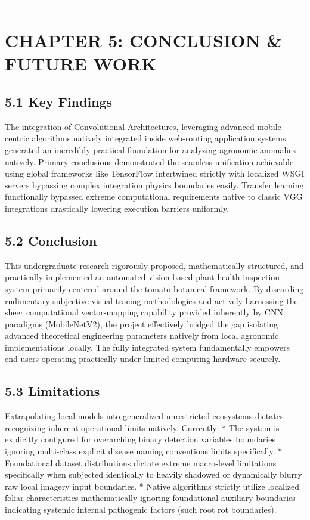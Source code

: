 \documentclass[
]{article}
\begin{document}
\begin{center}\rule{0.5\linewidth}{0.5pt}\end{center}

\section{CHAPTER 5: CONCLUSION \& FUTURE
WORK}\label{chapter-5-conclusion-future-work}

\subsection{5.1 Key Findings}\label{key-findings}

The integration of Convolutional Architectures, leveraging advanced
mobile-centric algorithms natively integrated inside web-routing
application systems generated an incredibly practical foundation for
analyzing agronomic anomalies natively. Primary conclusions demonstrated
the seamless unification achievable using global frameworks like
TensorFlow intertwined strictly with localized WSGI servers bypassing
complex integration physics boundaries easily. Transfer learning
functionally bypassed extreme computational requirements native to
classic VGG integrations drastically lowering execution barriers
uniformly.

\subsection{5.2 Conclusion}\label{conclusion}

This undergraduate research rigorously proposed, mathematically
structured, and practically implemented an automated vision-based plant
health inspection system primarily centered around the tomato botanical
framework. By discarding rudimentary subjective visual tracing
methodologies and actively harnessing the sheer computational
vector-mapping capability provided inherently by CNN paradigms
(MobileNetV2), the project effectively bridged the gap isolating
advanced theoretical engineering parameters natively from local
agronomic implementations locally. The fully integrated system
fundamentally empowers end-users operating practically under limited
computing hardware securely.

\subsection{5.3 Limitations}\label{limitations}

Extrapolating local models into generalized unrestricted ecosystems
dictates recognizing inherent operational limits natively. Currently: *
The system is explicitly configured for overarching binary detection
variables boundaries ignoring multi-class explicit disease naming
conventions limits specifically. * Foundational dataset distributions
dictate extreme macro-level limitations specifically when subjected
identically to heavily shadowed or dynamically blurry raw local imagery
input boundaries. * Native algorithms strictly utilize localized foliar
characteristics mathematically ignoring foundational auxiliary
boundaries indicating systemic internal pathogenic factors (such root
rot boundaries).
\end{document}
